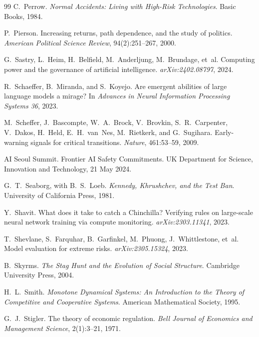 \documentclass[11pt]{article}
\theoremstyle{plain}
\theoremstyle{definition}
\begin{document}
\begin{thebibliography}{99}
 C.~Perrow. \emph{Normal Accidents: Living with High-Risk Technologies}. Basic Books, 1984.

 P.~Pierson. Increasing returns, path dependence, and the study of politics. \emph{American Political Science Review}, 94(2):251--267, 2000.

 G.~Sastry, L.~Heim, H.~Belfield, M.~Anderljung, M.~Brundage, et~al. Computing power and the governance of artificial intelligence. \emph{arXiv:2402.08797}, 2024.

 R.~Schaeffer, B.~Miranda, and S.~Koyejo. Are emergent abilities of large language models a mirage? In \emph{Advances in Neural Information Processing Systems 36}, 2023.

 M.~Scheffer, J.~Bascompte, W.~A.~Brock, V.~Brovkin, S.~R.~Carpenter, V.~Dakos, H.~Held, E.~H.~van~Nes, M.~Rietkerk, and G.~Sugihara. Early-warning signals for critical transitions. \emph{Nature}, 461:53--59, 2009.

 AI Seoul Summit. Frontier AI Safety Commitments. UK Department for Science, Innovation and Technology, 21 May 2024.

 G.~T.~Seaborg, with B.~S.~Loeb. \emph{Kennedy, Khrushchev, and the Test Ban}. University of California Press, 1981.

 Y.~Shavit. What does it take to catch a Chinchilla? Verifying rules on large-scale neural network training via compute monitoring. \emph{arXiv:2303.11341}, 2023.

 T.~Shevlane, S.~Farquhar, B.~Garfinkel, M.~Phuong, J.~Whittlestone, et~al. Model evaluation for extreme risks. \emph{arXiv:2305.15324}, 2023.

 B.~Skyrms. \emph{The Stag Hunt and the Evolution of Social Structure}. Cambridge University Press, 2004.

 H.~L.~Smith. \emph{Monotone Dynamical Systems: An Introduction to the Theory of Competitive and Cooperative Systems}. American Mathematical Society, 1995.

 G.~J.~Stigler. The theory of economic regulation. \emph{Bell Journal of Economics and Management Science}, 2(1):3--21, 1971.


\end{thebibliography}
\end{document}
